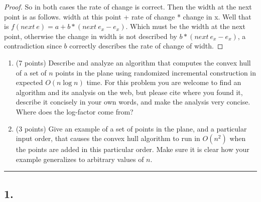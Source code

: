 \documentclass[11pt]{article}
\begin{document}
\begin{proof}
    So in both cases the rate of change is correct. Then the width at the next point is as follows.
    width at this point + rate of change * change in x. Well that is $f(next \: e) = a + b * (next \: e_x - e_x)$.
    Which must be the width at the next point, otherwise the change in width is not described by $b * (next \: e_x - e_x)$,
    a contradiction since $b$ correctly describes the rate of change of width.

\end{proof}




\begin{enumerate}

    \item (7 points) Describe and analyze an algorithm that computes the
        convex hull of a set of $n$ points in the plane using randomized
        incremental construction in expected $O(n \log n)$ time. For this
        problem you are welcome to find an algorithm and its analysis on the
        web, but please cite where you found it, describe it concisely in
        your own words, and make the analysis very concise. Where does the
        log-factor come from?

    \item (3 points) Give an example of a set of points in the plane, and a
        particular input order, that causes the convex hull algorithm to run in
        $O(n^2)$ when the points are added in this particular order. Make sure it
        is clear how your example generalizes to arbitrary values of $n$.

\end{enumerate}
\hrule

\subsection*{1. }
\end{document}
